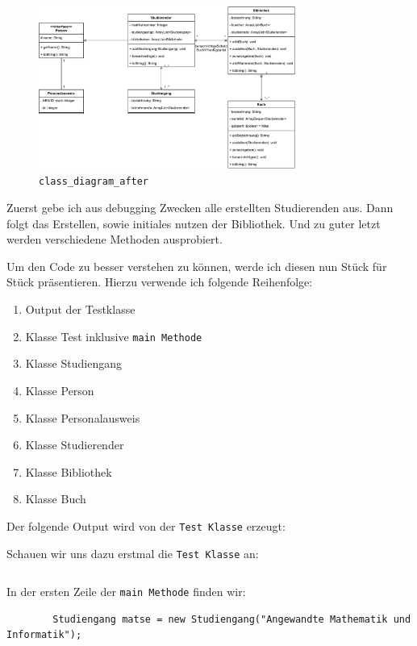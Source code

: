 \documentclass{article}
\begin{document}
    \begin{figure}[ht]
        \centering
        \includegraphics[width=0.75\textwidth]{swt_wende_tim_h07_class_diagram_after.pdf}
        \caption{\texttt{class\_diagram\_after}}
    \end{figure}

    \newpage
    Zuerst gebe ich aus debugging Zwecken alle erstellten Studierenden aus.
    Dann folgt das Erstellen, sowie initiales nutzen der Bibliothek.
    Und zu guter letzt werden verschiedene Methoden ausprobiert.

    Um den Code zu besser verstehen zu können, werde ich diesen nun Stück für Stück präsentieren.
    Hierzu verwende ich folgende Reihenfolge:
    
    \begin{enumerate}
        \item Output der Testklasse
        \item Klasse Test inklusive \texttt{main Methode}
        \item Klasse Studiengang
        \item Klasse Person
        \item Klasse Personalausweis
        \item Klasse Studierender
        \item Klasse Bibliothek
        \item Klasse Buch
    \end{enumerate}

    Der folgende Output wird von der \texttt{Test Klasse} erzeugt:
    

    \newpage
    Schauen wir uns dazu erstmal die \texttt{Test Klasse} an:
    \inputminted{java}{Test.java}

    \newpage
    In der ersten Zeile der \texttt{main Methode} finden wir:
    \begin{verbatim}
        Studiengang matse = new Studiengang("Angewandte Mathematik und Informatik");
    \end{verbatim}
\end{document}
